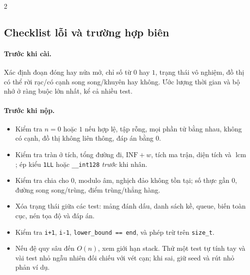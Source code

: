 \begin{multicols}{2}
\subsection{Checklist lỗi và trường hợp biên}
\paragraph{Trước khi cài.}
Xác định đoạn đóng hay nửa mở, chỉ số từ $0$ hay $1$, trạng thái vô
nghiệm, đồ thị có thể rời rạc/có cạnh song song/khuyên hay không.
Ước lượng thời gian và bộ nhớ ở ràng buộc lớn nhất, kể cả nhiều test.
\paragraph{Trước khi nộp.}
\begin{itemize}
\setlength{\itemsep}{2pt}
\item Kiểm tra $n=0$ hoặc $1$ nếu hợp lệ, tập rỗng, mọi phần tử bằng nhau,
      không có cạnh, đồ thị không liên thông, đáp án bằng $0$.
\item Kiểm tra tràn ở tích, tổng đường đi, $\mathrm{INF}+w$,
      tích ma trận, diện tích và $\operatorname{lcm}$;
      ép kiểu \texttt{1LL} hoặc \texttt{\_\_int128} \emph{trước} khi nhân.
\item Kiểm tra chia cho $0$, modulo âm, nghịch đảo không tồn tại;
      số thực gần $0$, đường song song/trùng, điểm trùng/thẳng hàng.
\item Xóa trạng thái giữa các test: mảng đánh dấu, danh sách kề,
      queue, biến toàn cục, nén tọa độ và đáp án.
\item Kiểm tra \texttt{i+1}, \texttt{i-1},
      \texttt{lower\_bound == end}, và phép trừ trên \texttt{size\_t}.
\item Nếu đệ quy sâu đến $O(n)$, xem giới hạn stack. Thử một test
      tự tính tay và vài test nhỏ ngẫu nhiên đối chiếu với vét cạn;
      khi sai, giữ seed và rút nhỏ phản ví dụ.
\end{itemize}

\end{multicols}
